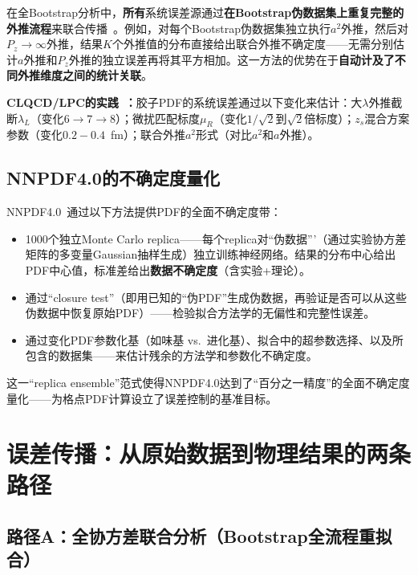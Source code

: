 \documentclass[12pt,a4paper]{ctexart}
\begin{document}
在全Bootstrap分析中，\textbf{所有}系统误差源通过\textbf{在Bootstrap伪数据集上重复完整的外推流程}来联合传播~\cite{GattringerLang2010}。例如，对每个Bootstrap伪数据集独立执行$a^2$外推，然后对$P_z \to \infty$外推，结果$K$个外推值的分布直接给出联合外推不确定度——无需分别估计$a$外推和$P_z$外推的独立误差再将其平方相加。这一方法的优势在于\textbf{自动计及了不同外推维度之间的统计关联}。

\textbf{CLQCD/LPC的实践~\cite{Chen2025gluon}：}胶子PDF的系统误差通过以下变化来估计：大$\lambda$外推截断$\lambda_L$（变化$6\to 7\to 8$）；微扰匹配标度$\mu_R$（变化$1/\sqrt{2}$到$\sqrt{2}$倍标度）；$z_s$混合方案参数（变化$0.2-0.4$~fm）；联合外推$a^2$形式（对比$a^2$和$a$外推）。

\subsection{NNPDF4.0的不确定度量化}

NNPDF4.0~\cite{NNPDF2021}通过以下方法提供PDF的全面不确定度带：
\begin{itemize}[nosep]
    \item 1000个独立Monte Carlo replica——每个replica对``伪数据'''（通过实验协方差矩阵的多变量Gaussian抽样生成）独立训练神经网络。结果的分布中心给出PDF中心值，标准差给出\textbf{数据不确定度}（含实验+理论）。
    \item 通过``closure test''（即用已知的``伪PDF''生成伪数据，再验证是否可以从这些伪数据中恢复原始PDF）——检验拟合方法学的无偏性和完整性误差。
    \item 通过变化PDF参数化基（如味基 vs.\ 进化基）、拟合中的超参数选择、以及所包含的数据集——来估计残余的方法学和参数化不确定度。
\end{itemize}

这一``replica ensemble''范式使得NNPDF4.0达到了``百分之一精度''的全面不确定度量化——为格点PDF计算设立了误差控制的基准目标。

\section{误差传播：从原始数据到物理结果的两条路径}

\subsection{路径A：全协方差联合分析（Bootstrap全流程重拟合）}
\end{document}
